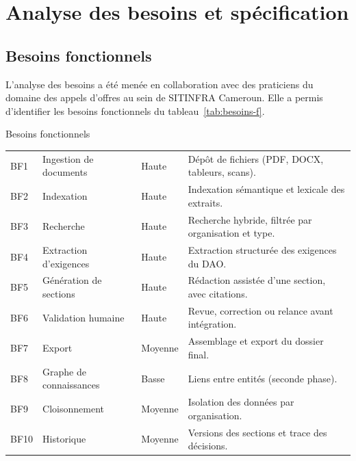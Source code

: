 \section{Analyse des besoins et spécification}
\label{sec:ch2-besoins}

\subsection{Besoins fonctionnels}

L'analyse des besoins a été menée en collaboration avec des praticiens du
domaine des appels d'offres au sein de SITINFRA Cameroun. Elle a permis
d'identifier les besoins fonctionnels du tableau~\ref{tab:besoins-f}.

\begin{btptable}{Besoins fonctionnels}
\label{tab:besoins-f}
\begin{tabularx}{\linewidth}{@{}C{1.1cm} L{3.6cm} C{2.0cm} Y@{}}
\toprule
{}
 &  &  &  \\
\midrule
BF1  & Ingestion de documents     & Haute    & Dépôt de fichiers (PDF, DOCX, tableurs, scans). \\
BF2  & Indexation                 & Haute    & Indexation sémantique et lexicale des extraits. \\
BF3  & Recherche                  & Haute    & Recherche hybride, filtrée par organisation et type. \\
BF4  & Extraction d'exigences     & Haute    & Extraction structurée des exigences du DAO. \\
BF5  & Génération de sections     & Haute    & Rédaction assistée d'une section, avec citations. \\
BF6  & Validation humaine         & Haute    & Revue, correction ou relance avant intégration. \\
BF7  & Export                     & Moyenne  & Assemblage et export du dossier final. \\
BF8  & Graphe de connaissances    & Basse    & Liens entre entités (seconde phase). \\
BF9  & Cloisonnement              & Moyenne  & Isolation des données par organisation. \\
BF10 & Historique                 & Moyenne  & Versions des sections et trace des décisions. \\
\bottomrule
\end{tabularx}
\end{btptable}

